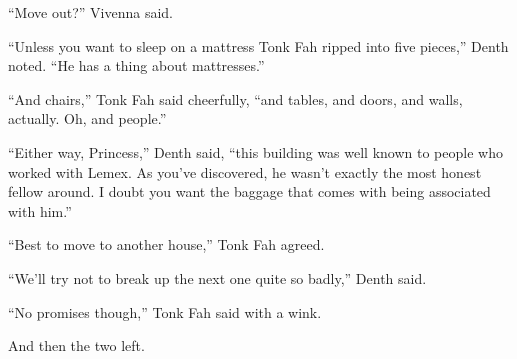 “Move out?” Vivenna said.

“Unless you want to sleep on a mattress Tonk Fah ripped into five pieces,” Denth noted. “He has a thing about mattresses.”

“And chairs,” Tonk Fah said cheerfully, “and tables, and doors, and walls, actually. Oh, and people.”

“Either way, Princess,” Denth said, “this building was well known to people who worked with Lemex. As you’ve discovered, he wasn’t exactly the most honest fellow around. I doubt you want the baggage that comes with being associated with him.”

“Best to move to another house,” Tonk Fah agreed.

“We’ll try not to break up the next one quite so badly,” Denth said.

“No promises though,” Tonk Fah said with a wink.

And then the two left.

